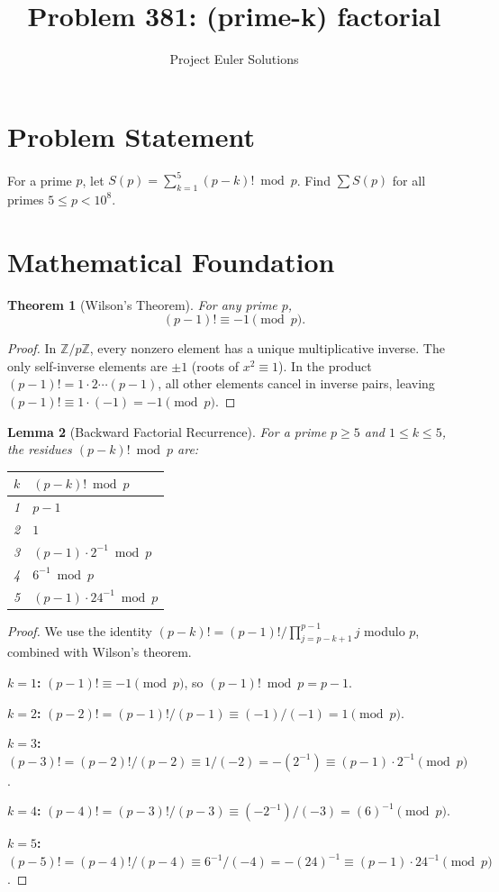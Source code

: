 \documentclass[11pt]{article}
\title{Problem 381: (prime-k) factorial}
\author{Project Euler Solutions}
\date{}
\newtheorem{theorem}{Theorem}
\newtheorem{lemma}[theorem]{Lemma}
\begin{document}
\maketitle

\section{Problem Statement}

For a prime $p$, let $S(p) = \sum_{k=1}^{5} (p-k)! \bmod p$. Find $\sum S(p)$ for all primes $5 \le p < 10^8$.

\section{Mathematical Foundation}

\begin{theorem}[Wilson's Theorem]
For any prime $p$,
\[
(p-1)! \equiv -1 \pmod{p}.
\]
\end{theorem}

\begin{proof}
In $\mathbb{Z}/p\mathbb{Z}$, every nonzero element has a unique multiplicative inverse. The only self-inverse elements are $\pm 1$ (roots of $x^2 \equiv 1$). In the product $(p-1)! = 1 \cdot 2 \cdots (p-1)$, all other elements cancel in inverse pairs, leaving $(p-1)! \equiv 1 \cdot (-1) = -1 \pmod{p}$.
\end{proof}

\begin{lemma}[Backward Factorial Recurrence]
For a prime $p \ge 5$ and $1 \le k \le 5$, the residues $(p-k)! \bmod p$ are:
\begin{center}
\begin{tabular}{cl}
\toprule
$k$ & $(p-k)! \bmod p$ \\
\midrule
1 & $p - 1$ \\
2 & $1$ \\
3 & $(p-1) \cdot 2^{-1} \bmod p$ \\
4 & $6^{-1} \bmod p$ \\
5 & $(p-1) \cdot 24^{-1} \bmod p$ \\
\bottomrule
\end{tabular}
\end{center}
\end{lemma}

\begin{proof}
We use the identity $(p-k)! = (p-1)! \big/ \prod_{j=p-k+1}^{p-1} j$ modulo $p$, combined with Wilson's theorem.

\textbf{$k=1$:} $(p-1)! \equiv -1 \pmod{p}$, so $(p-1)! \bmod p = p - 1$.

\textbf{$k=2$:} $(p-2)! = (p-1)!/(p-1) \equiv (-1)/(-1) = 1 \pmod{p}$.

\textbf{$k=3$:} $(p-3)! = (p-2)!/(p-2) \equiv 1/(-2) = -(2^{-1}) \equiv (p-1) \cdot 2^{-1} \pmod{p}$.

\textbf{$k=4$:} $(p-4)! = (p-3)!/(p-3) \equiv (-2^{-1})/(-3) = (6)^{-1} \pmod{p}$.

\textbf{$k=5$:} $(p-5)! = (p-4)!/(p-4) \equiv 6^{-1}/(-4) = -(24)^{-1} \equiv (p-1) \cdot 24^{-1} \pmod{p}$.
\end{proof}
\end{document}
